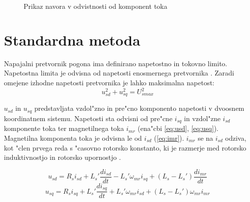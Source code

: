 \documentclass[journal,a4paper,twoside]{sty/IEEEtran}
\begin{document}
\begin{figure}
\caption{Prikaz navora v odvistnosti od komponent toka }
\label{fig:navor}
\end{figure}


\section{Standardna metoda}
\label{sec:stand}
Napajalni pretvornik pogona ima definirano napetostno in tokovno limito. Napetostna limita je odvisna od napetosti enosmernega pretvornika \cite{vas}.
Zaradi omejene izhodne napetosti pretvornika je lahko maksimalna napetost:
\begin{equation}
u_{sd}^2+u_{sq}^2= U_{smax}^2
\label{eq:napetostna_limita_osnovna}
\end{equation}

$u_{sd}$ in $u_{sq}$ predstavljata vzdol"zno in pre"cno komponento  napetosti v dvoosnem koordinatnem sistemu. Napetosti sta odvisni od pre"cne $i_{sq}$ in vzdol"zne $i_{sd}$ komponente toka ter magnetilnega  toka $i_{mr}$ (ena"cbi \ref{eq:usd}, \ref{eq:usq}). Magnetilna komponenta toka je odvisna le od $i_{sd}$ (\ref{eq:imr}). $i_{mr}$ se na $i_{sd}$ odziva, kot "clen prvega reda s "casovno rotorsko konstanto, ki je razmerje  med rotorsko induktivnostjo in rotorsko upornostjo \cite{servopogoni}.

\begin{equation}
u_{sd}= R_s i_{sd}+L_s' \frac{di_{sd}}{dt}- L_s' \omega_{mr} i_{sq}+(L_s-L_s')\frac{di_{mr}}{dt}
\label{eq:usd}
\end{equation}
\begin{equation}
u_{sq}= R_s i_{sq}+L_s' \frac{di_{sq}}{dt} + L_s' \omega_{mr}i_{sd}+(L_s-L_s')\omega_{mr}i_{mr}
\label{eq:usq}
\end{equation}
\end{document}
